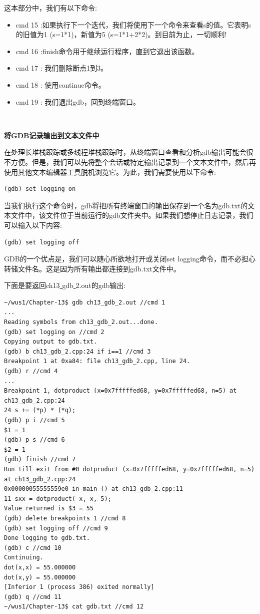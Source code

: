 这本部分中，我们有以下命令: \par

\begin{itemize}
	\item cmd 15 :如果执行下一个迭代，我们将使用下一个命令来查看s的值。它表明s的旧值为1 (s=1*1)，新值为5 (s=1*1+2*2)。到目前为止，一切顺利!
	\item cmd 16 :finish命令用于继续运行程序，直到它退出该函数。
	\item cmd 17 : 我们删除断点1到3。
	\item cmd 18 : 使用continue命令。
	\item cmd 19 : 我们退出gdb，回到终端窗口。
\end{itemize}

\noindent\textbf{}\ \par
\textbf{将GDB记录输出到文本文件中} \ \par
在处理长堆栈跟踪或多线程堆栈跟踪时，从终端窗口查看和分析gdb输出可能会很不方便。但是，我们可以先将整个会话或特定输出记录到一个文本文件中，然后再使用其他文本编辑器工具脱机浏览它。为此，我们需要使用以下命令: \par
\begin{lstlisting}[caption={}]
(gdb) set logging on
\end{lstlisting}

当我们执行这个命令时，gdb将把所有终端窗口的输出保存到一个名为gdb.txt的文本文件中，该文件位于当前运行的gdb文件夹中。如果我们想停止日志记录，我们可以输入以下内容: \par

\begin{lstlisting}[caption={}]
(gdb) set logging off
\end{lstlisting}

GDB的一个优点是，我们可以随心所欲地打开或关闭set logging命令，而不必担心转储文件名。这是因为所有输出都连接到gdb.txt文件中。 \par
下面是要返回ch13\underline{ }gdb\underline{ }2.out的gdb输出: \par

\begin{lstlisting}[caption={}]
~/wus1/Chapter-13$ gdb ch13_gdb_2.out //cmd 1
...
Reading symbols from ch13_gdb_2.out...done.
(gdb) set logging on //cmd 2
Copying output to gdb.txt.
(gdb) b ch13_gdb_2.cpp:24 if i==1 //cmd 3
Breakpoint 1 at 0xa84: file ch13_gdb_2.cpp, line 24.
(gdb) r //cmd 4
...
Breakpoint 1, dotproduct (x=0x7fffffed68, y=0x7fffffed68, n=5) at ch13_gdb_2.cpp:24
24 s += (*p) * (*q);
(gdb) p i //cmd 5
$1 = 1
(gdb) p s //cmd 6
$2 = 1
(gdb) finish //cmd 7
Run till exit from #0 dotproduct (x=0x7fffffed68, y=0x7fffffed68, n=5) at ch13_gdb_2.cpp:24
0x00000055555559e0 in main () at ch13_gdb_2.cpp:11
11 sxx = dotproduct( x, x, 5);
Value returned is $3 = 55
(gdb) delete breakpoints 1 //cmd 8
(gdb) set logging off //cmd 9
Done logging to gdb.txt.
(gdb) c //cmd 10
Continuing.
dot(x,x) = 55.000000
dot(x,y) = 55.000000
[Inferior 1 (process 386) exited normally]
(gdb) q //cmd 11
~/wus1/Chapter-13$ cat gdb.txt //cmd 12
\end{lstlisting}

